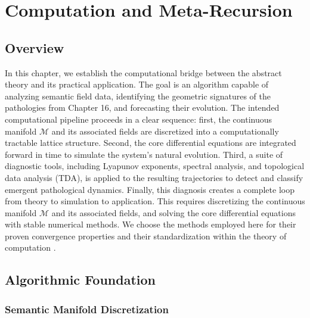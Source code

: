 \chapter{Computation and Meta-Recursion}
\label{17:computation_and_meta_recursion}


\section{Overview}
\label{17.1:overview}

In this chapter, we establish the computational bridge between the abstract theory and its practical application. The goal is an algorithm capable of analyzing semantic field data, identifying the geometric signatures of the pathologies from Chapter 16, and forecasting their evolution. The intended computational pipeline proceeds in a clear sequence: first, the continuous manifold \(\mathcal{M}\) and its associated fields are discretized into a computationally tractable lattice structure. Second, the core differential equations are integrated forward in time to simulate the system's natural evolution. Third, a suite of diagnostic tools, including Lyapunov exponents, spectral analysis, and topological data analysis (TDA), is applied to the resulting trajectories to detect and classify emergent pathological dynamics. Finally, this diagnosis creates a complete loop from theory to simulation to application. This requires discretizing the continuous manifold \(\mathcal{M}\) and its associated fields, and solving the core differential equations with stable numerical methods. We choose the methods employed here for their proven convergence properties and their standardization within the theory of computation \autocite{Sipser2012}.


\section{Algorithmic Foundation}
\label{17.2:algorithmic_foundation}


\subsection{Semantic Manifold Discretization}
\label{17.2.1:semantic_manifold_discretization}

